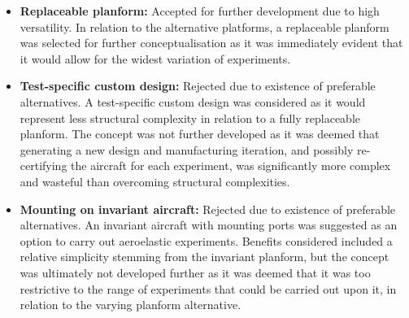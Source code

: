 \begin{itemize}
    \item \textbf{Replaceable planform:} Accepted for further development due to high versatility. In relation to the alternative platforms, a replaceable planform was selected for further conceptualisation as it was immediately evident that it would allow for the widest variation of experiments.
    \item \textbf{Test-specific custom design:} Rejected due to existence of preferable alternatives. A test-specific custom design was considered as it would represent less structural complexity in relation to a fully replaceable planform. The concept was not further developed as it was deemed that generating a new design and manufacturing iteration, and possibly re-certifying the aircraft for each experiment, was significantly more complex and wasteful than overcoming structural complexities.
    \item \textbf{Mounting on invariant aircraft:} Rejected due to existence of preferable alternatives. An invariant aircraft with mounting ports was suggested as an option to carry out aeroelastic experiments. Benefits considered included a relative simplicity stemming from the invariant planform, but the concept was ultimately not developed further as it was deemed that it was too restrictive to the range of experiments that could be carried out upon it, in relation to the varying planform alternative.
\end{itemize}

